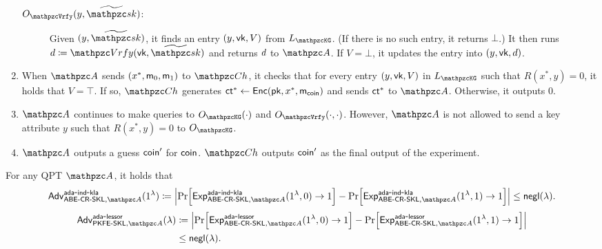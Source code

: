 \begin{definition}
\begin{enumerate}
\begin{description}
            \item[$\Oracle{\qVrfy}(y,\widetilde{\qsk})$:] Given $(y,\widetilde{\qsk})$, it finds an entry $(y,\mathsf{vk},V)$ from $\List{\qKG}$. (If there is no such entry, it returns $\bot$.) 
            It then runs $\decision \seteq \qVrfy(\vk,
            \widetilde{\qsk})$ and returns $d$ to $\qA$.
            If $V=\bot$, it updates the entry into $(y,\mathsf{vk},d)$.
            \end{description}
            \item \label{ada_lessor_abe_challenge}
            When $\qA$ sends $(x^*,\mathsf{m}_0,\mathsf{m}_1)$ to $\qCh$, 
            it checks that for every entry $(y,\mathsf{vk},V)$ in 
            $\List{\qKG}$ such that $R(x^*,y)=0$, it holds
            that $V=\top$. If so,
            $\qCh$ generates $\mathsf{ct}^*\leftarrow\mathsf{Enc}(\mathsf{pk},x^*,\mathsf{m}_{\mathsf{coin}})$ and
            sends $\mathsf{ct}^*$ to $\qA$. Otherwise, it outputs $0$.
            \item 
            $\qA$ continues to make queries to $\Oracle{\qKG}(\cdot)$ and  $\Oracle{\qVrfy}(\cdot,\cdot )$.
            However, $\qA$ is not allowed to send a key attribute
            $y$ such that $R(x^*,y)=0$ to $\Oracle{\qKG}$.
            \item $\qA$ outputs a guess $\mathsf{coin}^\prime$ for $\mathsf{coin}$. 
            $\qCh$ outputs $\mathsf{coin}'$ as the final output of the experiment.
        \end{enumerate}
        For any QPT $\qA$, it holds that
\ifnum{}        
\begin{align}
\advc{\ABESKL,\qA}{ada}{ind}{kla}(1^\secp) \seteq \abs{\Pr[\expc{\ABESKL,\qA}{ada}{ind}{kla} (1^\secp,0) \ra 1] - \Pr[\expc{\ABESKL,\qA}{ada}{ind}{kla} (1^\secp,1) \ra 1] }\leq \negl(\secp).
\end{align}
\else
\begin{align}
\advb{\PKFESKL,\qA}{ada}{lessor}(\secp) 
&\seteq \abs{\Pr[\expb{\ABESKL,\qA}{ada}{lessor} (1^\secp,0) \ra 1] - \Pr[\expb{\ABESKL,\qA}{ada}{lessor} (1^\secp,1) \ra 1] }\\
&\leq \negl(\secp).
\end{align}
\fi
\end{definition}


